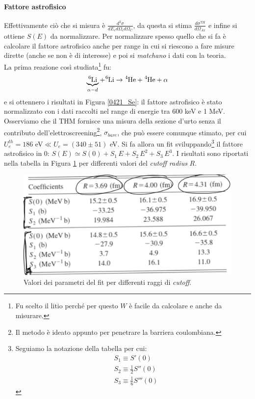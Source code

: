 \paragraph{Fattore astrofisico} Effettivamente ciò che si misura è $\frac{d^3\sigma}{dE_c d\Omega_cd\Omega_{C}}$, da questa si stima $\frac{d\sigma^{TH}}{d\Omega_{Ax}}$ e infine si ottiene $S(E)$ da normalizzare.
Per  normalizzare spesso quello che si fa è calcolare il fattore astrofisico anche per range in cui si riescono a fare misure dirette (anche se non è di interesse) e poi si \textit{matchano} i dati con la teoria.\\
La prima reazione così studiata\footnote{Fu scelto il litio perché per questo $W$ è facile da calcolare e anche da misurare.} fu:
$$ \underbrace{\ce{^6Li}}_{\alpha-d} + \ce{^6Li} \to \ce{^4He} + \ce{^4He} + \alpha $$
e si ottennero i risultati in Figura \ref{0421_Se}: il fattore astrofisico è stato normalizzato con i dati raccolti nel range di energie tra 600 keV e 1 MeV. Osserviamo che il THM fornisce una misura della sezione d'urto senza il contributo dell'elettroscreening\footnote{Il metodo è ideato appunto per penetrare la barriera coulombiana.}, $\sigma_{bare}$, che può essere comunque stimato, per cui $U_e^{th}=186$ eV$\ll U_e = (340\pm 51)$ eV.
\noindent Si fa allora un fit sviluppando\footnote{Seguiamo la notazione della tabella per cui:%
\begin{align*}%
	&S_1 \equiv S'(0) \\
	&S_2 \equiv \frac{1}{2}S''(0) \\
	&S_3 \equiv \frac{1}{6}S'''(0) 
\end{align*}%
} il fattore astrofisico in 0: $S(E) \simeq S(0) + S_1 \, E + S_2 \, E^2 + S_3 \, E^3$. I risultati sono riportati nella tabella in Figura \ref{0421_tab} per differenti valori del \textit{cutoff radius} $R$.

\begin{figure}[h]
	\centering
	\includegraphics[scale=0.5]{Immagini/0421_tab.png}
	\caption{Valori dei parametri del fit per differenti raggi di \textit{cutoff}.}
	\label{0421_tab}
\end{figure}

